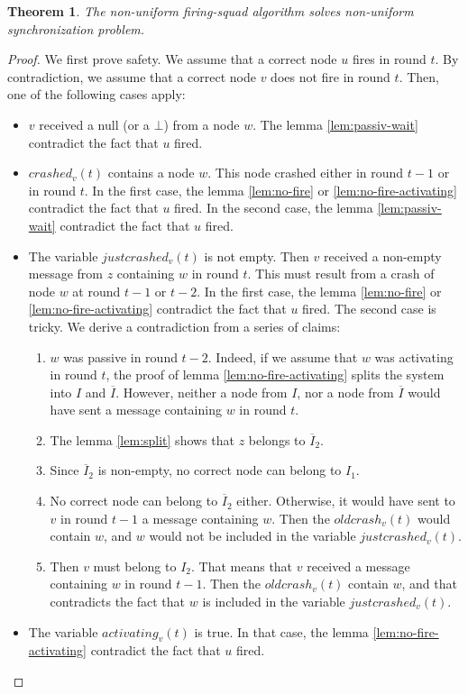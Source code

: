 \documentclass{article}
\newtheorem{theorem}{Theorem}
\begin{document}
\begin{theorem}
	The non-uniform firing-squad algorithm solves non-uniform synchronization problem.
\end{theorem}
\begin{proof}
	We first prove safety. We assume that a correct node $u$ fires in round $t$.
	By contradiction, we assume that a correct node $v$ does not fire in round $t$.
	Then, one of the following cases apply:
	\begin{itemize}
		\item $v$ received a null (or a $\bot$) from a node $w$.
			The lemma \ref{lem:passiv-wait} contradict the fact that $u$ fired.
		\item $crashed_v(t)$ contains a node $w$. This node crashed either in round $t-1$ or in round $t$.
			In the first case, the lemma \ref{lem:no-fire} or \ref{lem:no-fire-activating} contradict the fact that $u$ fired.
			In the second case, the lemma \ref{lem:passiv-wait} contradict the fact that $u$ fired.
		\item The variable $justcrashed_v(t)$ is not empty. Then $v$ received a non-empty message from $z$ containing $w$ in round $t$. 
			This must result from a crash of node $w$ at round $t-1$ or $t-2$.
			In the first case, the lemma \ref{lem:no-fire} or \ref{lem:no-fire-activating} contradict the fact that $u$ fired.
			The second case is tricky. We derive a contradiction from a series of claims:
			\begin{enumerate}
				\item $w$ was passive in round $t-2$.
					Indeed, if we assume that $w$ was activating in round $t$, the proof of lemma \ref{lem:no-fire-activating} splits the system into $I$ and $\overline{I}$.
					However, neither a node from $I$, nor a node from $\overline{I}$ would have sent a message containing $w$ in round $t$.
				\item The lemma \ref{lem:split} shows that $z$ belongs to $\overline{I}_2$.
				\item Since $\overline{I}_2$ is non-empty, no correct node can belong to $I_1$.
				\item No correct node can belong to $\overline{I}_2$ either. Otherwise, it would have sent to $v$ in round $t-1$ a message containing $w$.
					Then the $oldcrash_v(t)$ would contain $w$, and $w$ would not be included in the variable $justcrashed_v(t)$.
				\item Then $v$ must belong to $I_2$. That means that $v$ received a message containing $w$ in round $t-1$.
					Then the $oldcrash_v(t)$ contain $w$, and that contradicts the fact that $w$ is included in the variable $justcrashed_v(t)$.
			\end{enumerate}
		\item The variable $activating_v(t)$ is true.
			In that case, the lemma \ref{lem:no-fire-activating} contradict the fact that $u$ fired.
	\end{itemize}




\end{proof}
\end{document}
